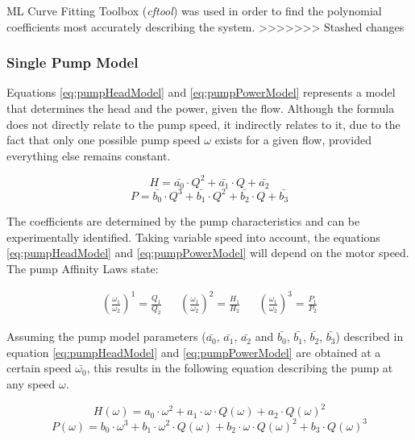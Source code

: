 ML Curve Fitting Toolbox (\textit{cftool}) \cite{cftool}
was used in order to find the polynomial coefficients most accurately describing the system.
>>>>>>> Stashed changes
\subsubsection{Single Pump Model}
Equations \ref{eq:pumpHeadModel} and \ref{eq:pumpPowerModel} represents a model that 
determines the head and the power, given the flow. 
Although the formula does not directly relate to the pump speed, it indirectly 
relates to it, due to the fact that only one possible pump speed $\omega$ exists for a given flow,
provided everything else remains constant.

\begin{equation}
	H = \bar{a_{0}} \cdot Q^2 + \bar{a_{1}} \cdot Q + \bar{a_{2}}
	\label{eq:pumpHeadModel}
\end{equation}
\begin{equation}
	P = \bar{b_{0}} \cdot Q^3 + \bar{b_{1}} \cdot Q^2 + \bar{b_{2}} \cdot Q + \bar{b_{3}}
	\label{eq:pumpPowerModel}
\end{equation}


The coefficients are determined by the pump characteristics and can be experimentally identified.
Taking variable speed into account, the equations \ref{eq:pumpHeadModel}  and \ref{eq:pumpPowerModel}
will depend on the motor speed. The pump Affinity Laws state:

\begin{align*}
	\left(\frac{\omega_1}{\omega_2}\right)^1 = \frac{Q_1}{Q_2} && 
	\left(\frac{\omega_1}{\omega_2}\right)^2 = \frac{H_1}{H_2} &&
	\left(\frac{\omega_1}{\omega_2}\right)^3 = \frac{P_1}{P_2}	
\end{align*}

Assuming the pump model parameters ($\bar{a_{0}}$, $\bar{a_{1}}$, $\bar{a_{2}}$ and $\bar{b_{0}}$,
$\bar{b_{1}}$, $\bar{b_{2}}$, $\bar{b_{3}}$) described in equation \ref{eq:pumpHeadModel} and 
\ref{eq:pumpPowerModel} are obtained at a certain speed $\bar{\omega_{0}}$, 
this results in the following equation describing the pump at any speed $\omega$.

\begin{equation}
	H(\omega) = a_0 \cdot \omega^2 + a_1 \cdot \omega \cdot Q(\omega) + a_2 \cdot Q(\omega)^2
	\label{eq:pumpHeadModel2}
\end{equation}
\begin{equation}
	P(\omega) = b_0 \cdot \omega^3 + b_1 \cdot \omega^2 \cdot Q(\omega) + b_2 \cdot \omega \cdot Q(\omega)^2 + b_3 \cdot Q(\omega)^3
	\label{eq:pumpPowerModel2}
\end{equation}

